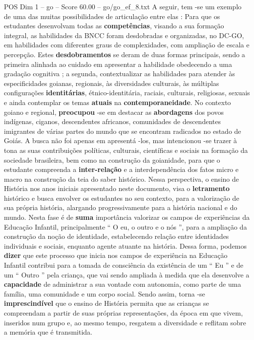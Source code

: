 \begin{textsample}{POS Dim 1 – go – Score 60.00 – go/go\_ef\_8.txt}
A seguir, tem -se um exemplo de uma das muitas possibilidades de articulação entre elas : Para que os estudantes desenvolvam todas as \textbf{competências}, visando a sua formação integral, as habilidades da BNCC foram desdobradas e organizadas, no DC-GO, em habilidades com diferentes graus de complexidades, com ampliação de escala e percepção.
Estes \textbf{desdobramentos} se deram de duas formas principais, sendo a primeira alinhada ao cuidado em apresentar a habilidade obedecendo a uma gradação cognitiva ; a segunda, contextualizar as habilidades para atender às especificidades goianas, regionais, às diversidades culturais, às múltiplas configurações \textbf{identitárias}, étnico-identitária, raciais, culturais, religiosas, sexuais e ainda contemplar os temas \textbf{atuais} na \textbf{contemporaneidade}.
No contexto goiano e regional, \textbf{preocupou} -se em destacar as \textbf{abordagens} dos povos indígenas, ciganos, descendentes africanos, comunidades de descendentes imigrantes de várias partes do mundo que se encontram radicados no estado de Goiás.
A busca não foi apenas em apresentá -los, mas intencionou -se trazer à tona as suas contribuições políticas, culturais, científicas e sociais na formação da sociedade brasileira, bem como na construção da goianidade, para que o estudante compreenda a \textbf{inter-relação} e a interdependência dos fatos micro e macro na construção da teia do saber histórico.
Nessa perspectiva, o ensino de História nos anos iniciais apresentado neste documento, visa o \textbf{letramento} histórico e busca envolver os estudantes no seu contexto, para a valorização de sua própria história, alargando progressivamente para a história nacional e do mundo.
Nesta fase é de \textbf{suma} importância valorizar os campos de experiências da Educação Infantil, principalmente “ O eu, o outro e o nós ”, para a ampliação da construção da noção de identidade, estabelecendo relação entre identidades individuais e sociais, enquanto agente atuante na história.
Dessa forma, podemos \textbf{dizer} que este processo que inicia nos campos de experiência na Educação Infantil contribui para a tomada de consciência da existência de um “ Eu ” e de um “ Outro ” pela criança, que vai sendo ampliada à medida que ela desenvolve a \textbf{capacidade} de administrar a sua vontade com autonomia, como parte de uma família, uma comunidade e um corpo social.
Sendo assim, torna -se \textbf{imprescindível} que o ensino de História permita que as crianças se compreendam a partir de suas próprias representações, da época em que vivem, inseridos num grupo e, ao mesmo tempo, resgatem a diversidade e reflitam sobre a memória que é transmitida.

\end{textsample}

